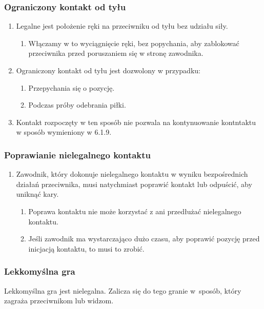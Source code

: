 \documentclass[11pt,a4paper]{article}
\begin{document}
\subsubsection{Ograniczony kontakt od tyłu}
\begin{enumerate}
  \item Legalne jest położenie ręki na przeciwniku od tyłu bez udziału siły.
  \begin{enumerate}
    \item Włączamy w to wyciągnięcie ręki, bez popychania, aby zablokować przeciwnika przed poruszaniem się w stronę zawodnika.
  \end{enumerate}
  \item Ograniczony kontakt od tyłu jest dozwolony w przypadku:
  \begin{enumerate}
    \item Przepychania się o pozycję.
    \item Podczas próby odebrania piłki.
  \end{enumerate}
  \item Kontakt rozpoczęty w ten sposób nie pozwala na kontynuowanie kontntaktu w sposób wymieniony w 6.1.9. %
\end{enumerate}

\subsubsection{Poprawianie nielegalnego kontaktu}
\begin{enumerate}
  \item Zawodnik, który dokonuje nielegalnego kontaktu w wyniku bezpośrednich działań przeciwnika, musi natychmiast poprawić kontakt lub odpuścić, aby uniknąć kary.
  \begin{enumerate}
    \item Poprawa kontaktu nie może korzystać z ani przedłużać nielegalnego kontaktu.
    \item Jeśli zawodnik ma wystarczająco dużo czasu, aby poprawić pozycję przed inicjacją kontaktu, to musi to zrobić.
  \end{enumerate}
\end{enumerate}

\subsubsection{Lekkomyślna gra}
Lekkomyślna gra jest nielegalna. Zalicza się do tego granie w~sposób,
który zagraża przeciwnikom lub widzom.
\end{document}
